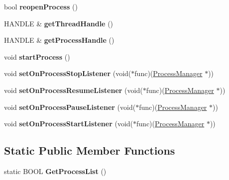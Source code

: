 \begin{DoxyCompactItemize}
\item 
\hypertarget{class_process_manager_a892aec6660bcb53b59bc643301339244}{bool {\bfseries reopen\+Process} ()}\label{class_process_manager_a892aec6660bcb53b59bc643301339244}

\item 
\hypertarget{class_process_manager_ad8a16ccbaf3626fc0c1a4c77cc5242f0}{H\+A\+N\+D\+L\+E \& {\bfseries get\+Thread\+Handle} ()}\label{class_process_manager_ad8a16ccbaf3626fc0c1a4c77cc5242f0}

\item 
\hypertarget{class_process_manager_a9ef3daadbc5c9fbadf2b27959fa6ad48}{H\+A\+N\+D\+L\+E \& {\bfseries get\+Process\+Handle} ()}\label{class_process_manager_a9ef3daadbc5c9fbadf2b27959fa6ad48}

\item 
\hypertarget{class_process_manager_aabe96d5c6ae637b751b512220e5979ec}{void {\bfseries start\+Process} ()}\label{class_process_manager_aabe96d5c6ae637b751b512220e5979ec}

\item 
\hypertarget{class_process_manager_a14bf654b6b333cf41b632c49d9a8efef}{void {\bfseries set\+On\+Process\+Stop\+Listener} (void($\ast$func)(\hyperlink{class_process_manager}{Process\+Manager} $\ast$))}\label{class_process_manager_a14bf654b6b333cf41b632c49d9a8efef}

\item 
\hypertarget{class_process_manager_a719434f2fe5c003f355b712dcddad850}{void {\bfseries set\+On\+Process\+Resume\+Listener} (void($\ast$func)(\hyperlink{class_process_manager}{Process\+Manager} $\ast$))}\label{class_process_manager_a719434f2fe5c003f355b712dcddad850}

\item 
\hypertarget{class_process_manager_a0c0a42010c6e7949fc6cbebf853cbceb}{void {\bfseries set\+On\+Process\+Pause\+Listener} (void($\ast$func)(\hyperlink{class_process_manager}{Process\+Manager} $\ast$))}\label{class_process_manager_a0c0a42010c6e7949fc6cbebf853cbceb}

\item 
\hypertarget{class_process_manager_a97612a29cefa1f517635e096c1e91691}{void {\bfseries set\+On\+Process\+Start\+Listener} (void($\ast$func)(\hyperlink{class_process_manager}{Process\+Manager} $\ast$))}\label{class_process_manager_a97612a29cefa1f517635e096c1e91691}

\end{DoxyCompactItemize}
\subsection*{Static Public Member Functions}
\begin{DoxyCompactItemize}
\item 
\hypertarget{class_process_manager_a3d9add158edf3b5112981bf231394c41}{static B\+O\+O\+L {\bfseries Get\+Process\+List} ()}\label{class_process_manager_a3d9add158edf3b5112981bf231394c41}

\end{DoxyCompactItemize}
